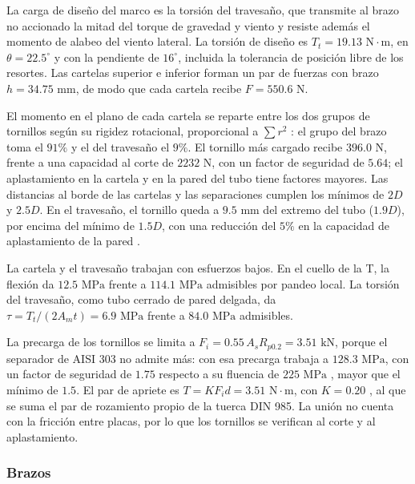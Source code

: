 \documentclass[../../General.tex]{subfiles}
\begin{document}
La carga de diseño del marco es la torsión del travesaño, que transmite al brazo no accionado la mitad del torque de gravedad y viento y resiste además el momento de alabeo del viento lateral. La torsión de diseño es $T_t = 19.13\text{ N}\cdot\text{m}$, en $\theta = 22.5^\circ$ y con la pendiente de $16^\circ$, incluida la tolerancia de posición libre de los resortes. Las cartelas superior e inferior forman un par de fuerzas con brazo $h = 34.75\text{ mm}$, de modo que cada cartela recibe $F = 550.6\text{ N}$.

El momento en el plano de cada cartela se reparte entre los dos grupos de tornillos según su rigidez rotacional, proporcional a $\sum r^2$ \citep{Shigley11th}: el grupo del brazo toma el $91\%$ y el del travesaño el $9\%$. El tornillo más cargado recibe $396.0\text{ N}$, frente a una capacidad al corte de $2232\text{ N}$, con un factor de seguridad de $5.64$; el aplastamiento en la cartela y en la pared del tubo tiene factores mayores. Las distancias al borde de las cartelas y las separaciones cumplen los mínimos de $2D$ y $2.5D$. En el travesaño, el tornillo queda a $9.5\text{ mm}$ del extremo del tubo ($1.9D$), por encima del mínimo de $1.5D$, con una reducción del $5\%$ en la capacidad de aplastamiento de la pared \citep{aluminum2005manual}.

La cartela y el travesaño trabajan con esfuerzos bajos. En el cuello de la T, la flexión da $12.5\text{ MPa}$ frente a $114.1\text{ MPa}$ admisibles por pandeo local. La torsión del travesaño, como tubo cerrado de pared delgada, da $\tau = T_t/(2A_m t) = 6.9\text{ MPa}$ frente a $84.0\text{ MPa}$ admisibles.

La precarga de los tornillos se limita a $F_i = 0.55\,A_s R_{p0.2} = 3.51\text{ kN}$, porque el separador de AISI 303 no admite más: con esa precarga trabaja a $128.3\text{ MPa}$, con un factor de seguridad de $1.75$ respecto a su fluencia de $225\text{ MPa}$ \citep{ficha_aisi303}, mayor que el mínimo de $1.5$. El par de apriete es $T = K F_i d = 3.51\text{ N}\cdot\text{m}$, con $K = 0.20$ \citep{Shigley11th}, al que se suma el par de rozamiento propio de la tuerca DIN 985. La unión no cuenta con la fricción entre placas, por lo que los tornillos se verifican al corte y al aplastamiento.

\subsubsection{Brazos}
\end{document}
